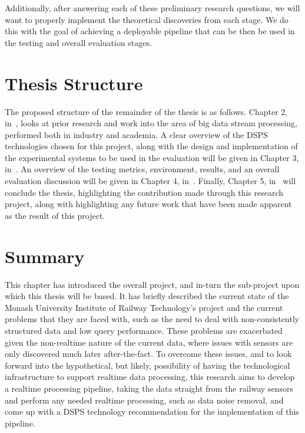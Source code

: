 Additionally, after answering each of these preliminary research questions, we will want to properly implement the
theoretical discoveries from each stage. We do this with the goal of achieving a deployable pipeline that can be then
be used in the testing and overall evaluation stages.



\section{Thesis Structure} %
\label{sub:proposed_thesis_chapter_headings}

The proposed structure of the remainder of the thesis is as follows. Chapter 2, in~, looks at prior
research and work into the area of big data stream processing, performed both in industry and academia.
A clear overview of the DSPS technologies chosen for this project, along with the design and implementation
of the experimental systems to be used in the evaluation will be given in Chapter 3, in~.
An overview of the testing metrics, environment, results, and an overall evaluation discussion will be given in Chapter 4, in~.
Finally, Chapter 5, in~ will conclude the thesis, highlighting the contribution made through this research project,
along with highlighting any future work that have been made apparent as the result of this project.



\section{Summary} %
\label{sec:summary}

This chapter has introduced the overall project, and in-turn the sub-project upon which this thesis will be based. It
has briefly described the current state of the Monash University Institute of Railway Technology's project and the current
problems that they are faced with, such as the need to deal with non-consistently structured data and low query
performance. These problems are exacerbated given the non-realtime nature of the current data, where issues with sensors
are only discovered much later after-the-fact. To overcome these issues, and to look forward into the hypothetical,
but likely, possibility of having the technological infrastructure to support realtime data processing, this research
aims to develop a realtime processing pipeline, taking the data straight from the railway sensors and perform any
needed realtime processing, such as data noise removal, and come up with a DSPS technology recommendation for the implementation of this pipeline.

